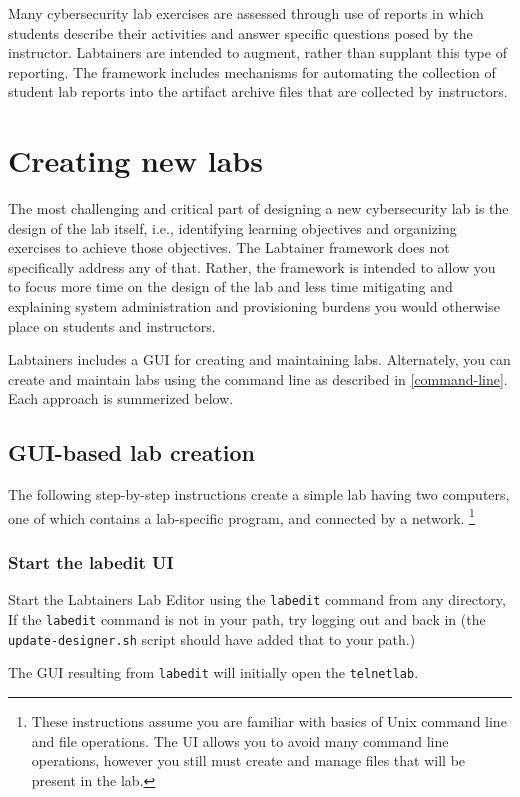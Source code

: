 \documentclass[12pt]{article}
\begin{document}
Many cybersecurity lab exercises are assessed through use of reports in which students
describe their activities and answer specific questions posed by the instructor.  Labtainers
are intended to augment, rather than supplant this type of reporting.  The framework includes
mechanisms for automating the collection of student lab reports into the artifact archive files
that are collected by instructors. 


\section {Creating new labs}
\label{sec:new_labs}
The most challenging and critical part of designing a new cybersecurity lab
is the design of the lab itself, i.e., identifying learning objectives and
organizing exercises to achieve those objectives.  The Labtainer framework
does not specifically address any of that.  Rather, the framework is intended
to allow you to focus more time on the design of the lab and less time mitigating and
explaining system administration and provisioning burdens you would otherwise place on 
students and instructors.

Labtainers includes a GUI for creating and maintaining labs.  Alternately, you can create
and maintain labs using the command line as described in \ref{command-line}.   Each approach is summerized below.

\subsection{GUI-based lab creation}
The following step-by-step instructions create a simple lab having two computers, one of which
contains a lab-specific program, and connected by a network. \footnote{These instructions assume you are
familiar with basics of Unix command line and file operations.  The UI allows you to avoid many command line
operations, however you still must create and manage files that will be present in the lab.}

\subsubsection{Start the labedit UI}
Start the Labtainers Lab Editor using the {\tt labedit} command from any directory,  If
the {\tt labedit} command is not in your path, try logging out and back in (the {\tt update-designer.sh}
script should have added that to your path.)  

The GUI resulting from {\tt labedit} will initially open the {\tt telnetlab}. 
\end{document}
